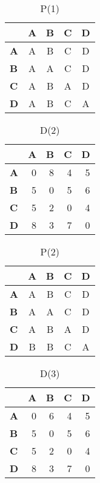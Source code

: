 \documentclass[11pt]{article}
\begin{document}
\begin{table}[H]\centering
\caption{P(1)}
\begin{tabular}{l c c c c}
\toprule
 & \textbf{A} & \textbf{B} & \textbf{C} & \textbf{D}\\\midrule
\textbf{A} & \cellcolor{yellow!30}A & B & C & D \\
\textbf{B} & A & \cellcolor{yellow!30}A & C & D \\
\textbf{C} & A & B & \cellcolor{yellow!30}A & D \\
\textbf{D} & A & B & C & \cellcolor{yellow!30}A \\
\bottomrule
\end{tabular}
\end{table}

\begin{table}[H]\centering
\caption{D(2)}
\begin{tabular}{l r r r r}
\toprule
 & \textbf{A} & \textbf{B} & \textbf{C} & \textbf{D}\\\midrule
\textbf{A} & 0 & 8 & 4 & 5 \\
\textbf{B} & 5 & 0 & 5 & 6 \\
\textbf{C} & 5 & 2 & 0 & 4 \\
\textbf{D} & \cellcolor{yellow!30}8 & 3 & 7 & 0 \\
\bottomrule
\end{tabular}
\end{table}

\begin{table}[H]\centering
\caption{P(2)}
\begin{tabular}{l c c c c}
\toprule
 & \textbf{A} & \textbf{B} & \textbf{C} & \textbf{D}\\\midrule
\textbf{A} & A & B & C & D \\
\textbf{B} & A & A & C & D \\
\textbf{C} & A & B & A & D \\
\textbf{D} & \cellcolor{yellow!30}B & B & C & A \\
\bottomrule
\end{tabular}
\end{table}

\begin{table}[H]\centering
\caption{D(3)}
\begin{tabular}{l r r r r}
\toprule
 & \textbf{A} & \textbf{B} & \textbf{C} & \textbf{D}\\\midrule
\textbf{A} & 0 & \cellcolor{yellow!30}6 & 4 & 5 \\
\textbf{B} & 5 & 0 & 5 & 6 \\
\textbf{C} & 5 & 2 & 0 & 4 \\
\textbf{D} & 8 & 3 & 7 & 0 \\
\bottomrule
\end{tabular}
\end{table}
\end{document}
